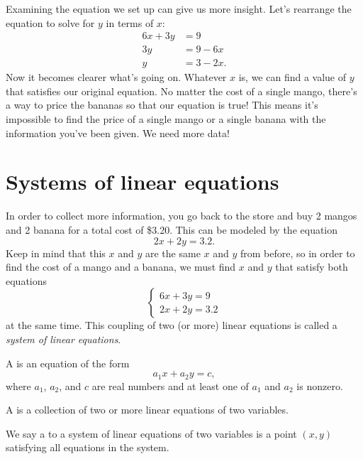 \documentclass[nooutcomes]{ximera}
\begin{document}
Examining the equation we set up can give us more insight. Let's rearrange the equation to solve for $y$ in terms of $x$:
\begin{align*}
6x + 3y & = 9 \\
3y & = 9 - 6x \\
y & = 3 - 2x.
\end{align*}
Now it becomes clearer what's going on. Whatever $x$ is, we can find a value of $y$ that satisfies our original equation. No matter the cost of a single mango, there's a way to price the bananas so that our equation is true! This means it's impossible to find the price of a single mango or a single banana with the information you've been given. We need more data!

\section{Systems of linear equations}

In order to collect more information, you go back to the store and buy 2 mangos and 2 banana for a total cost of \$3.20. This can be modeled by the equation 
$$
2x + 2y = 3.2.
$$
Keep in mind that this $x$ and $y$ are the same $x$ and $y$ from before, so in order to find the cost of a mango and a banana, we must find $x$ and $y$ that satisfy both equations
$$
\begin{cases}
6x + 3y = 9 \\
2x + 2y = 3.2
\end{cases}
$$
at the same time. This coupling of two (or more) linear equations is called a \emph{system of linear equations}.

\begin{definition}
A  is an equation of the form
$$
a_1 x + a_2 y = c,
$$
where $a_1$, $a_2$, and $c$ are real numbers and at least one of $a_1$ and 	$a_2$ is nonzero.

A  is a collection of two or more linear equations of two variables.

We say a  to a system of linear equations of two variables is a point $(x, y)$ satisfying all equations in the system. 
\end{definition}
\end{document}
